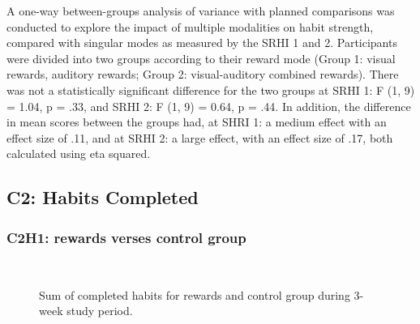 \documentclass{scaffold/sigchi}
\begin{document}
A one-way between-groups analysis of variance with planned comparisons was conducted to explore the
impact of multiple modalities on habit strength, compared with singular modes as measured by the SRHI 1 and 2. Participants were divided into two groups according to their reward mode (Group 1: visual rewards, auditory rewards; Group 2: visual-auditory combined rewards). There was not a
statistically significant difference for the two groups at SRHI 1: F (1, 9) = 1.04, p = .33, and SRHI 2: F (1, 9) = 0.64, p = .44. In addition, the difference in mean scores between the groups had, at SHRI 1: a medium effect with an effect size of .11, and at SRHI 2: a large effect, with an effect size of .17, both calculated using eta squared.

\subsection{C2: Habits Completed}

\subsubsection{C2H1: rewards verses control group}

\begin{figure}
  \centering
  \caption{Sum of completed habits for rewards and control group during 3-week study period.}~\label{fig:c2_h2}
\end{figure}
\end{document}
